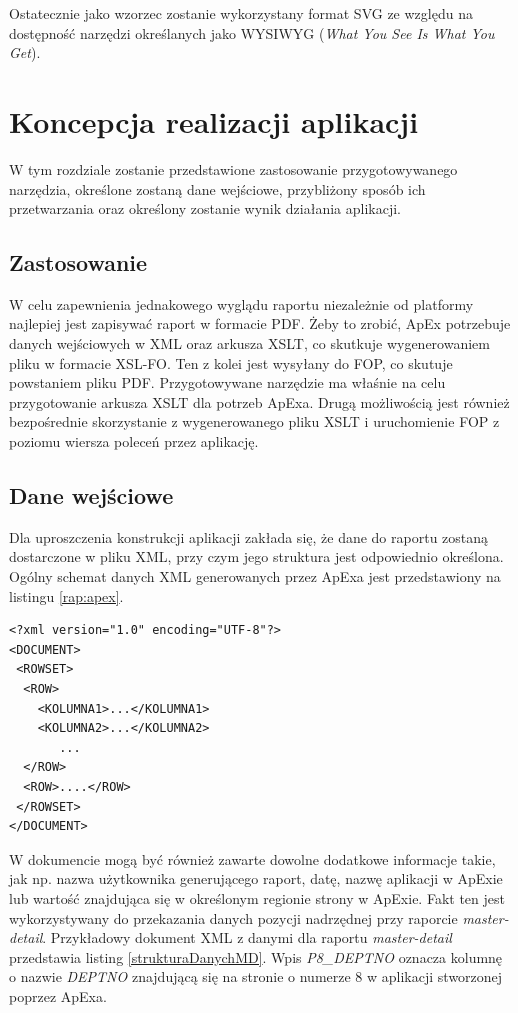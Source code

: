 \documentclass[11pt,a4paper]{article}
\begin{document}
Ostatecznie jako wzorzec zostanie wykorzystany format SVG ze względu na dostępność narzędzi określanych jako WYSIWYG (\emph{What You See Is What You Get}).

\section{Koncepcja realizacji aplikacji}
W tym rozdziale zostanie przedstawione zastosowanie przygotowywanego narzędzia, określone zostaną dane wejściowe, przybliżony sposób ich przetwarzania oraz określony zostanie wynik działania aplikacji.

\subsection{Zastosowanie}\label{sec:appZast}
W celu zapewnienia jednakowego wyglądu raportu niezależnie od platformy najlepiej jest zapisywać raport w formacie PDF. Żeby to zrobić, ApEx potrzebuje danych wejściowych w XML oraz arkusza XSLT, co skutkuje wygenerowaniem pliku w formacie XSL-FO. Ten z kolei jest wysyłany do FOP, co skutuje powstaniem pliku PDF. Przygotowywane narzędzie ma właśnie na celu przygotowanie arkusza XSLT dla potrzeb ApExa. Drugą możliwością jest również bezpośrednie skorzystanie z wygenerowanego pliku XSLT i uruchomienie FOP z poziomu wiersza poleceń przez aplikację. 

\subsection{Dane wejściowe}\label{sec:appDane}
Dla uproszczenia konstrukcji aplikacji zakłada się, że dane do raportu zostaną dostarczone w pliku XML, przy czym jego struktura jest odpowiednio określona. Ogólny schemat danych XML generowanych przez ApExa jest przedstawiony na listingu \ref{rap:apex}.\\

\lstset{language=XML}
\begin{lstlisting}[frame=single,caption=Ogólna postać dokumentu XML z danymi pochodzącymi z ApExa,label=rap:apex]
<?xml version="1.0" encoding="UTF-8"?>
<DOCUMENT>
 <ROWSET>
  <ROW>
    <KOLUMNA1>...</KOLUMNA1>
    <KOLUMNA2>...</KOLUMNA2>
       ...	
  </ROW>
  <ROW>....</ROW>
 </ROWSET>
</DOCUMENT>
\end{lstlisting}

W dokumencie mogą być również zawarte dowolne dodatkowe informacje takie, jak np. nazwa użytkownika generującego raport, datę, nazwę aplikacji w ApExie lub wartość znajdująca się w określonym regionie strony w ApExie. Fakt ten jest wykorzystywany do przekazania danych pozycji nadrzędnej przy raporcie \emph{master-detail}. Przykładowy dokument XML z danymi dla raportu \emph{master-detail} przedstawia listing \ref{strukturaDanychMD}. Wpis \emph{P8\_DEPTNO} oznacza kolumnę o nazwie \emph{DEPTNO} znajdującą się na stronie o numerze 8 w aplikacji stworzonej poprzez ApExa.
\end{document}

